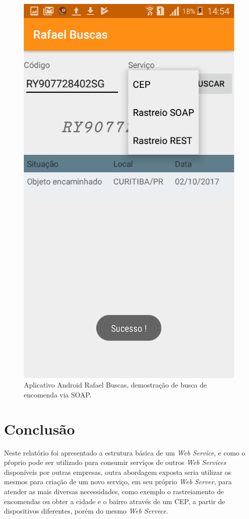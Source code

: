 \documentclass[12pt]{article}
\begin{document}
  	\begin{figure}[H]
  		\centering
  		\includegraphics[scale=0.2]{Imagens/android.png}
  		\caption{Aplicativo Android Rafael Buscas, demostração de busca de encomenda via SOAP.}
  		\label{and}
  	\end{figure}
   
\section{Conclusão}
Neste relatório foi apresentado a estrutura básica de um \textit{Web Service}, e como o pŕoprio pode ser utilizado para consumir serviços de outros \textit{Web Services} disponíveis por outras empresas, outra abordagem exposta seria utilizar os mesmos para criação de um novo serviço, em seu próprio \textit{Web Server}, para atender as mais diversas necessidades, como exemplo o rastreiamento de encomendas ou obter a cidade e o bairro através de um CEP, a partir de dispositivos diferentes, porém do mesmo \textit{Web Servece}.	  	

	  
\end{document}
